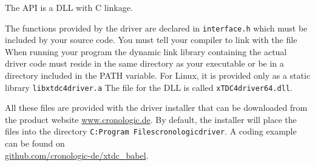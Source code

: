 
The API is a DLL with C linkage.\par

The functions provided by the driver are declared in
\texttt{\tu interface.h} 
which must be included by your source code.
You must tell your compiler to link with the file
When running your program the dynamic link library containing the actual
driver code must reside in the same directory as your executable or be in a
directory included in the PATH variable. For Linux, it is provided only as a
static library \texttt{libxtdc4\tu driver.a} 
The file for the DLL is called \texttt{xTDC4\tu driver\tu 64.dll}.

All these files are provided with the driver installer that can be downloaded
from the product website \href{https://www.cronologic.de}{www.cronologic.de}. 
By default, the installer will place the files into the directory 
\texttt{C:\filesep Program Files\filesep cronologic\filesep \deviceName\filesep driver}.
A coding example can be found on\\
\href{https://github.com/cronologic-de/xtdc_babel/tree/main/timetagger4_user_guide_example}{github.com/cronologic-de/xtdc\_babel}.


 
